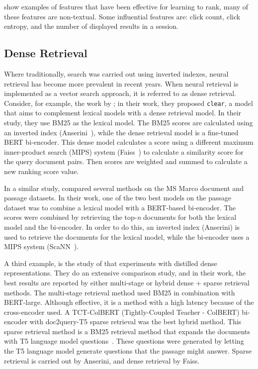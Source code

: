  show examples of features that have been effective for learning to rank, many of these features are non-textual. Some influential features are: click count, click entropy, and the number of displayed results in a session. 

\subsection{Dense Retrieval}
Where traditionally, search was carried out using inverted indexes, neural retrieval has become more prevalent in recent years. When neural retrieval \citep{neural-ir} is implemented as a vector search approach, it is referred to as dense retrieval.
Consider, for example, the work by \citet{dense-retrieval-1}; in their work, they proposed \texttt{clear}, a model that aims to complement lexical models with a dense retrieval model. In their study, they use BM25 as the lexical model. The BM25 scores are calculated using an inverted index (Anserini~\citep{anserini}), while the dense retrieval model is a fine-tuned BERT bi-encoder. This dense model calculates a score using a different maximum inner-product search (MIPS) system (Faiss~\citep{faiss}) to calculate a similarity score for the query document pairs. Then scores are weighted and summed to calculate a new ranking score value. 

In a similar study, \citet{dense-retrieval-2} compared several methods on the MS Marco document and passage datasets. In their work, one of the two best models on the passage dataset was to combine a lexical model with a BERT-based bi-encoder. The scores were combined by retrieving the top-\textit{n} documents for both the lexical model and the bi-encoder. In order to do this, an inverted index (Anserini) is used to retrieve the documents for the lexical model, while the bi-encoder uses a MIPS system (ScaNN~\citep{scann}).

A third example, is the study of  \citet{dense-retrieval-3} that experiments with distilled dense representations. They do an extensive comparison study, and in their work, the best results are reported by either multi-stage or hybrid dense + sparse retrieval methods. The multi-stage retrieval method used BM25 in combination with BERT-large. Although effective, it is a method with a high latency because of the cross-encoder used. A TCT-ColBERT (Tightly-Coupled Teacher - ColBERT) bi-encoder with doc2query-T5 sparse retrieval was the best hybrid method. This sparse retrieval method is a BM25 retrieval method that expands the documents with T5 language model questions~\citep{2020t5}. These questions were generated by letting the T5 language model generate questions that the passage might answer. Sparse retrieval is carried out by Anserini, and dense retrieval by Faiss. 


